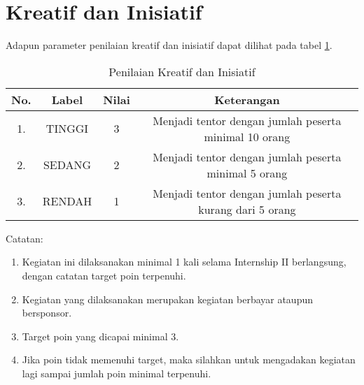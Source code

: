\section{Kreatif dan Inisiatif}

Adapun parameter penilaian kreatif dan inisiatif dapat dilihat pada tabel \ref{tab:nilaikreatifinisiatif}.

\begin{table}[H]
\caption{Penilaian Kreatif dan Inisiatif}
\centering
\begin{tabular}{|c|c|c|c|}
\hline
\textbf{No.}&\textbf{Label}&\textbf{Nilai}&\textbf{Keterangan}\\
\hline
1.&TINGGI&3&Menjadi tentor dengan jumlah peserta minimal 10 orang\\
\hline
2.&SEDANG&2&Menjadi tentor dengan jumlah peserta minimal 5 orang\\
\hline
3.&RENDAH&1&Menjadi tentor dengan jumlah peserta kurang dari 5 orang\\
\hline
\end{tabular}
\label{tab:nilaikreatifinisiatif}
\end{table}

Catatan:
\begin{enumerate}
\item Kegiatan ini dilaksanakan minimal 1 kali selama Internship II berlangsung, dengan catatan target poin terpenuhi.
\item Kegiatan yang dilaksanakan merupakan kegiatan berbayar ataupun bersponsor.
\item Target poin yang dicapai minimal 3.
\item Jika poin tidak memenuhi target, maka silahkan untuk mengadakan kegiatan lagi sampai jumlah poin minimal terpenuhi.
\end{enumerate} 